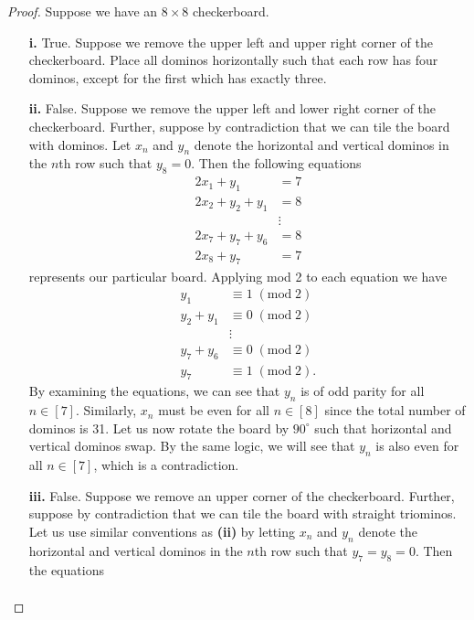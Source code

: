 \documentclass[ 12pt ]{article}
\begin{document}
\begin{enumerate}
		\begin{proof}
			Suppose we have an $8 \times 8$ checkerboard.
			\begin{enumerate}
				\item[\textbf{i.}] True. Suppose we remove the upper left and upper right corner of the checkerboard. Place all dominos horizontally such that each row has four dominos,
					except for the first which has exactly three.
				\item[\textbf{ii.}] False. Suppose we remove the upper left and lower right corner of the checkerboard. Further, suppose by contradiction that we can tile the board
					with dominos. Let $x_n$ and $y_n$ denote the horizontal and vertical dominos in the $n$th row such that $y_8 = 0$. Then the following equations
					\begin{align*}
						2x_1 + y_1 &= 7 \\
						2x_2 + y_2 + y_1 &= 8 \\
						&\vdots \\
						2x_7 + y_7 + y_6 &= 8 \\
						2x_8 + y_7 &= 7
					\end{align*}
					represents our particular board. Applying mod 2 to each equation we have
					\begin{align*}
						y_1 &\equiv 1\; (\mathrm{mod}\; 2) \\
						y_2 + y_1 &\equiv 0\; (\mathrm{mod}\; 2) \\
						&\vdots \\
						y_7 + y_6 &\equiv 0\; (\mathrm{mod}\; 2) \\
						y_7 &\equiv 1\; (\mathrm{mod}\; 2).
					\end{align*}
					By examining the equations, we can see that $y_n$ is of odd parity for all $n \in [7]$. Similarly, $x_n$ must be even for all $n \in [8]$ since the total number of
					dominos is 31. Let us now rotate the board by $90^\circ$ such that horizontal and vertical dominos swap. By the same logic, we will see that $y_n$ is also even for
					all $n \in [7]$, which is a contradiction.
				\item[\textbf{iii.}] False. Suppose we remove an upper corner of the checkerboard. Further, suppose by contradiction that we can tile the board with straight triominos.
					Let us use similar conventions as \textbf{(ii)} by letting $x_n$ and $y_n$ denote the horizontal and vertical dominos in the $n$th row such that $y_7 = y_8 = 0$.
					Then the equations
					\begin{align*}

\end{align*}
\end{enumerate}
\end{proof}
\end{enumerate}
\end{document}
